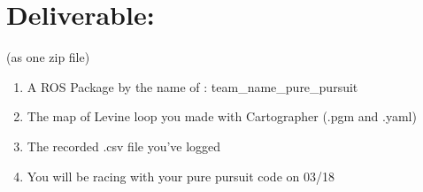 \documentclass[letta4 paper]{article}
\begin{document}
\section{Deliverable:}
(as one zip file)
\begin{enumerate}
    \item A ROS Package by the name of : team\_name\_pure\_pursuit 
    \item The map of Levine loop you made with Cartographer (.pgm and .yaml)
    \item The recorded .csv file you've logged
    \item You will be racing with your pure pursuit code on 03/18
\end{enumerate}{}
\end{document}
